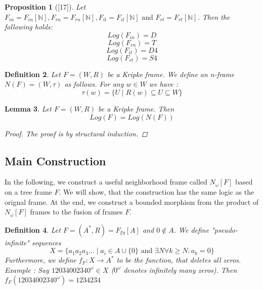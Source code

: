\documentclass[12pt, a4paper]{scrartcl}
\newtheorem{definition}{Definition}[subsection]
\newtheorem{lemma}[definition]{Lemma}
\newtheorem{proposition}[definition]{Proposition}
\begin{document}
\begin{proposition}[\textnormal{[17]}]
    Let $F_{in} = F_{in}[\mathbb{N}], F_{rn} = F_{rn}[\mathbb{N}], F_{it} = F_{it}[\mathbb{N}] \mbox{ and } F_{rt} = F_{rt}[\mathbb{N}]$. Then the following holds: \newline 
    $$ Log(F_{in}) = D$$
    $$ Log(F_{rn}) = T$$
    $$ Log(F_{it}) = D4$$
    $$ Log(F_{rt}) = S4$$

\end{proposition}

\begin{definition}
    Let $F = (W,R)$ be a Kripke frame. We define an n-frame $N(F) = (W, \tau)$ as follows.
    For any $w\in W$ we have :
    $$\tau(w) = \{ U \mid R(w) \subseteq U \subseteq W \}$$
        
\end{definition}

\begin{lemma}

    Let $F = (W,R)$ be a Kripke frame. Then $$Log(F) = Log(N(F))$$ 
    \begin{proof}
        The proof is by structural induction.
    \end{proof}
\end{lemma}


\subsection{Main Construction}
In the following, we construct a useful neighborhood frame called $N_\omega[F]$ based on a tree frame $F$.
We will show, that the construction has the same logic as the orignal frame. 
At the end, we construct a bounded morphism from the product of $N_\omega[F]$ frames to the fusion of frames $F$.


\begin{definition}
    Let $F = (A^*, R) = F_{\xi \eta}[A]$ and $0 \notin A$. We define "pseudo-infinite" sequences 
    $$X = \{a_1a_2a_3... \mid a_i \in A \cup \{0\} \mbox{ and } \exists N \forall k \geq N : a_k = 0\}$$
    Furthermore, we define $f_F : X \rightarrow A^*$ to be the function, that deletes all zeros. \newline \newline
    Example : Say $12034002340^\omega \in X$ ($0^\omega$ denotes infinitely many zeros). Then $f_F(12034002340^\omega) = 1234234$

\end{definition}
\end{document}
